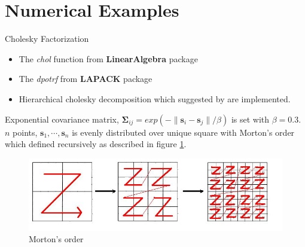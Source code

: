 \section{Numerical Examples}

\begin{frame}{Cholesky Factorization}
\footnotesize

\begin{itemize}
	\item The \textit{chol} function from \textbf{LinearAlgebra} package
	\item The \textit{dpotrf} from \textbf{LAPACK} package
	\item Hierarchical cholesky decomposition which suggested by \citet{hackbusch2015hierarchical} are implemented. 
\end{itemize}
	
Exponential covariance matrix, $\boldsymbol{\Sigma}_{ij}=exp(-\lVert \mathbf{s}_i-\mathbf{s}_j \rVert/\beta)$ is set with $\beta=0.3$. $n$ points, $\mathbf{s}_1,\cdots,\mathbf{s}_n$ is evenly distributed over unique square with Morton's order which defined recursively as described in figure \ref{fig:morton}.

\begin{figure}[h]
	\centering
	\includegraphics[width=.5\linewidth]{figs/Morton.jpg}
	\caption{Morton's order\citep{salem2016comparative}}
	\label{fig:morton}
\end{figure}
\end{frame}

